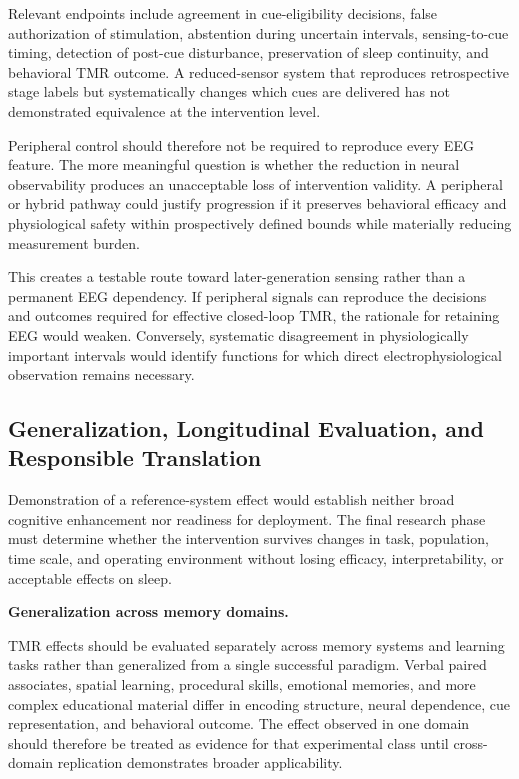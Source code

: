 Relevant endpoints include agreement in cue-eligibility decisions, false
authorization of stimulation, abstention during uncertain intervals,
sensing-to-cue timing, detection of post-cue disturbance, preservation of sleep
continuity, and behavioral TMR outcome. A reduced-sensor system that reproduces
retrospective stage labels but systematically changes which cues are delivered
has not demonstrated equivalence at the intervention level.

Peripheral control should therefore not be required to reproduce every EEG
feature. The more meaningful question is whether the reduction in neural
observability produces an unacceptable loss of intervention validity.
A peripheral or hybrid pathway could justify progression if it preserves
behavioral efficacy and physiological safety within prospectively defined
bounds while materially reducing measurement burden.

This creates a testable route toward later-generation sensing rather than a
permanent EEG dependency. If peripheral signals can reproduce the decisions and
outcomes required for effective closed-loop TMR, the rationale for retaining
EEG would weaken. Conversely, systematic disagreement in physiologically
important intervals would identify functions for which direct
electrophysiological observation remains necessary.


\subsection{Generalization, Longitudinal Evaluation, and Responsible Translation}

Demonstration of a reference-system effect would establish neither broad
cognitive enhancement nor readiness for deployment. The final research phase
must determine whether the intervention survives changes in task, population,
time scale, and operating environment without losing efficacy,
interpretability, or acceptable effects on sleep.

\noindent\textbf{Generalization across memory domains.}

TMR effects should be evaluated separately across memory systems and learning
tasks rather than generalized from a single successful paradigm. Verbal paired
associates, spatial learning, procedural skills, emotional memories, and more
complex educational material differ in encoding structure, neural dependence,
cue representation, and behavioral outcome. The effect observed in one domain
should therefore be treated as evidence for that experimental class until
cross-domain replication demonstrates broader applicability.

